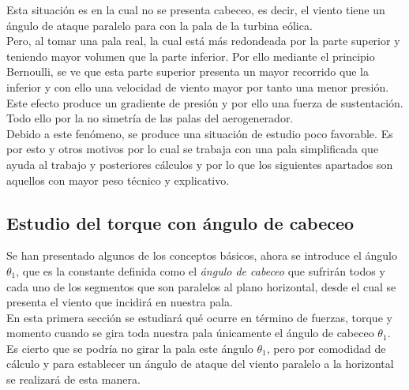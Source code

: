 Esta situación es en la cual no se presenta cabeceo, es decir, el viento tiene un ángulo de ataque paralelo para con la pala de la turbina eólica. \\

Pero, al tomar una pala real, la cual está más redondeada por la parte superior y teniendo mayor volumen que la parte inferior. Por ello mediante el principio Bernoulli, se ve que esta parte superior presenta un mayor recorrido que la inferior y con ello una velocidad de viento mayor por tanto una menor presión. \\

Este efecto produce un gradiente de presión y por ello una fuerza de sustentación. Todo ello por la no simetría de las palas del aerogenerador. \\

Debido a este fenómeno, se produce una situación de estudio poco favorable. Es por esto y otros motivos por lo cual se trabaja con una pala simplificada que ayuda al trabajo y posteriores cálculos y por lo que los siguientes apartados son aquellos con mayor peso técnico y explicativo. \\





















\subsection{Estudio del torque con ángulo de cabeceo}
\label{section:torque_giro_inicial}

Se han presentado algunos de los conceptos básicos, ahora se introduce el ángulo $ \theta_1 $, que es la constante definida como el \textit{ángulo de cabeceo} que sufrirán todos y cada uno de los segmentos que son paralelos al plano horizontal, desde el cual se presenta el viento que incidirá en nuestra pala.\\


En esta primera sección se estudiará qué ocurre en término de fuerzas, torque y momento cuando se gira toda nuestra pala únicamente el ángulo de cabeceo $ \theta_1 $. \\


Es cierto que se podría no girar la pala este ángulo $ \theta_1 $, pero por comodidad de cálculo y para establecer un ángulo de ataque del viento paralelo a la horizontal se realizará de esta manera.\\



